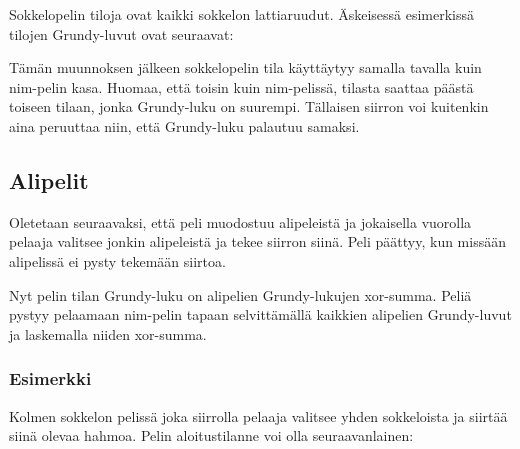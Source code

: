 Sokkelopelin tiloja ovat kaikki sokkelon
lattiaruudut. Äskeisessä esimerkissä
tilojen Grundy-luvut ovat seuraavat:

\begin{center}
\end{center}

Tämän muunnoksen jälkeen sokkelopelin
tila käyttäytyy
samalla tavalla kuin nim-pelin kasa.
Huomaa, että toisin kuin nim-pelissä,
tilasta saattaa päästä toiseen tilaan,
jonka Grundy-luku on suurempi.
Tällaisen siirron voi kuitenkin
aina peruuttaa niin,
että Grundy-luku palautuu samaksi.

\subsection{Alipelit}

Oletetaan seuraavaksi, että peli muodostuu
alipeleistä ja jokaisella vuorolla
pelaaja valitsee jonkin alipeleistä ja
tekee siirron siinä.
Peli päättyy, kun missään alipelissä ei
pysty tekemään siirtoa.

Nyt pelin tilan Grundy-luku on alipelien
Grundy-lukujen xor-summa.
Peliä pystyy pelaamaan nim-pelin
tapaan selvittämällä kaikkien alipelien Grundy-luvut
ja laskemalla niiden xor-summa.

\subsubsection*{Esimerkki}

Kolmen sokkelon pelissä joka siirrolla pelaaja
valitsee yhden sokkeloista ja siirtää siinä olevaa hahmoa.
Pelin aloitustilanne voi olla seuraavanlainen:

